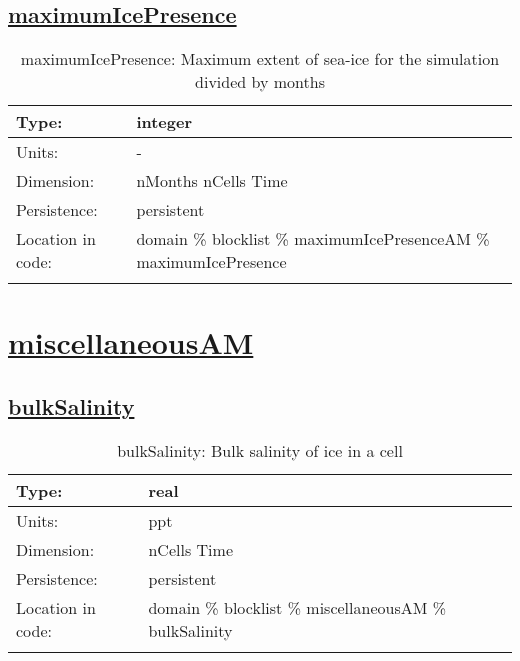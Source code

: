 \subsection[maximumIcePresence]{\hyperref[sec:var_tab_maximumIcePresenceAM]{maximumIcePresence}}
\label{subsec:var_sec_maximumIcePresenceAM_maximumIcePresence}
\begin{center}
\begin{longtable}{| p{2.0in} | p{4.0in} |}
        \hline 
        Type: & integer \\
        \hline 
        Units: & \si{-} \\
        \hline 
        Dimension: & nMonths nCells Time \\
        \hline 
        Persistence: & persistent \\
        \hline 
         Location in code: & domain \% blocklist \% maximumIcePresenceAM \% maximumIcePresence \\
         \hline 
    \caption{maximumIcePresence: Maximum extent of sea-ice for the simulation divided by months}
\end{longtable}
\end{center}
\section[miscellaneousAM]{\hyperref[sec:var_tab_miscellaneousAM]{miscellaneousAM}}
\label{sec:var_sec_miscellaneousAM}
\subsection[bulkSalinity]{\hyperref[sec:var_tab_miscellaneousAM]{bulkSalinity}}
\label{subsec:var_sec_miscellaneousAM_bulkSalinity}
\begin{center}
\begin{longtable}{| p{2.0in} | p{4.0in} |}
        \hline 
        Type: & real \\
        \hline 
        Units: & \si{ppt} \\
        \hline 
        Dimension: & nCells Time \\
        \hline 
        Persistence: & persistent \\
        \hline 
         Location in code: & domain \% blocklist \% miscellaneousAM \% bulkSalinity \\
         \hline 
    \caption{bulkSalinity: Bulk salinity of ice in a cell}
\end{longtable}
\end{center}
